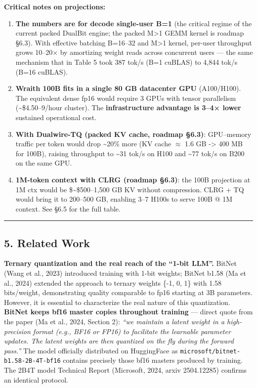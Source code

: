 \textbf{Critical notes on projections:}

\begin{enumerate}
\def\labelenumi{\arabic{enumi}.}
\item
  \textbf{The numbers are for decode single-user B=1} (the critical
  regime of the current packed DualBit engine; the packed M\textgreater1
  GEMM kernel is roadmap §6.3). With effective batching B=16--32 and
  M\textgreater1 kernel, per-user throughput grows 10--20× by amortizing
  weight reads across concurrent users --- the same mechanism that in
  Table 5 took 387 tok/s (B=1 cuBLAS) to 4,844 tok/s (B=16 cuBLAS).
\item
  \textbf{Wraith 100B fits in a single 80 GB datacenter GPU}
  (A100/H100). The equivalent dense fp16 would require 3 GPUs with
  tensor parallelism (\textasciitilde\$4.50--9/hour cluster). The
  \textbf{infrastructure advantage is 3--4× lower} sustained operational
  cost.
\item
  \textbf{With Dualwire-TQ (packed KV cache, roadmap §6.3)}: GPU--memory
  traffic per token would drop \textasciitilde20\% more (KV cache
  \(\approx\) 1.6 GB -> 400 MB for 100B), raising throughput to
  \textasciitilde31 tok/s on H100 and \textasciitilde77 tok/s on B200 on
  the same GPU.
\item
  \textbf{1M-token context with CLRG (roadmap §6.3)}: the 100B
  projection at 1M ctx would be \$\sim\$500--1,500 GB KV without
  compression. CLRG + TQ would bring it to 200--500 GB, enabling 3--7
  H100s to serve 100B @ 1M context. See §6.5 for the full table.
\end{enumerate}

\begin{center}\rule{0.5\linewidth}{0.5pt}\end{center}

\subsection{5. Related Work}\label{related-work}

\textbf{Ternary quantization and the real reach of the ``1-bit LLM''.}
BitNet (Wang et al., 2023) introduced training with 1-bit weights;
BitNet b1.58 (Ma et al., 2024) extended the approach to ternary weights
\{-1, 0, 1\} with 1.58 bits/weight, demonstrating quality comparable to
fp16 starting at 3B parameters. However, it is essential to characterize
the real nature of this quantization. \textbf{BitNet keeps bf16 master
copies throughout training} --- direct quote from the paper (Ma et al.,
2024, Section 2): \emph{``we maintain a latent weight in a
high-precision format (e.g., BF16 or FP16) to facilitate the learnable
parameter updates. The latent weights are then quantized on the fly
during the forward pass.''} The model officially distributed on
HuggingFace as \texttt{microsoft/bitnet-b1.58-2B-4T-bf16} contains
precisely those bf16 masters produced by training. The 2B4T model
Technical Report (Microsoft, 2024, arxiv 2504.12285) confirms an
identical protocol.

